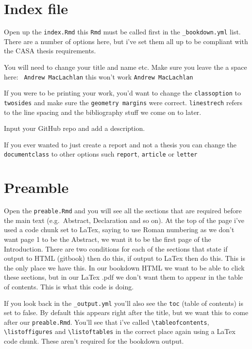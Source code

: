 \documentclass[
  12pt,
  oneside]{book}
\begin{document}
\hypertarget{index-file}{%
\section{Index file}\label{index-file}}

Open up the \texttt{index.Rmd} this \texttt{Rmd} must be called first in the \texttt{\_bookdown.yml} list. There are a number of options here, but i've set them all up to be compliant with the CASA thesis requirements.

You will need to change your title and name etc. Make sure you leave the a space here: \texttt{\textbar{}\ Andrew\ MacLachlan} this won't work \texttt{\textbar{}Andrew\ MacLachlan}

If you were to be printing your work, you'd want to change the \texttt{classoption} to \texttt{twosides} and make sure the \texttt{geometry\ margins} were correct. \texttt{linestrech} refers to the line spacing and the bibliography stuff we come on to later.

Input your GitHub repo and add a description.

If you ever wanted to just create a report and not a thesis you can change the \texttt{documentclass} to other options such \texttt{report}, \texttt{article} or \texttt{letter}

\hypertarget{preamble}{%
\section{Preamble}\label{preamble}}

Open the \texttt{preable.Rmd} and you will see all the sections that are required before the main text (e.g.~Abstract, Declaration and so on). At the top of the page i've used a code chunk set to LaTex, saying to use Roman numbering as we don't want page 1 to be the Abstract, we want it to be the first page of the Introduction. There are two conditions for each of the sections that state if output to HTML (gitbook) then do this, if output to LaTex then do this. This is the only place we have this. In our bookdown HTML we want to be able to click these sections, but in our LaTex .pdf we don't want them to appear in the table of contents. This is what this code is doing.

If you look back in the \texttt{\_output.yml} you'll also see the \texttt{toc} (table of contents) is set to false. By default this appears right after the title, but we want this to come after our \texttt{preable.Rmd}. You'll see that i've called \texttt{\textbackslash{}tableofcontents}, \texttt{\textbackslash{}listoffigures} and \texttt{\textbackslash{}listoftables} in the correct place again using a LaTex code chunk. These aren't required for the bookdown output.
\end{document}
